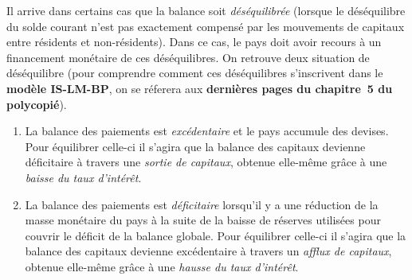 Il arrive dans certains cas que la balance soit \emph{déséquilibrée} (lorsque le déséquilibre 
du solde courant n'est pas exactement compensé par les mouvements de capitaux 
entre résidents et non-résidents).
Dans ce cas, le pays doit avoir recours à un financement monétaire de ces déséquilibres.
On retrouve deux situation de déséquilibre (pour comprendre comment ces déséquilibres
s'inscrivent dans le \textbf{modèle IS-LM-BP},
on se réferera aux \textbf{dernières pages du chapitre~5 du polycopié}).
\begin{enumerate}
  \item La balance des paiements est \emph{excédentaire} et le pays accumule des devises.
  Pour équilibrer celle-ci il s'agira que la balance des capitaux devienne déficitaire à
  travers une \emph{sortie de capitaux}, 
  obtenue elle-même grâce à une \emph{baisse du taux d'intérêt}.
  \item La balance des paiements est \emph{déficitaire} lorsqu'il y a une réduction
  de la masse monétaire du pays à la suite de la baisse de réserves utilisées 
  pour couvrir le déficit de la balance globale.
  Pour équilibrer celle-ci il s'agira que la balance des capitaux devienne excédentaire à
  travers un \emph{afflux de capitaux}, 
  obtenue elle-même grâce à une \emph{hausse du taux d'intérêt}.
\end{enumerate}





